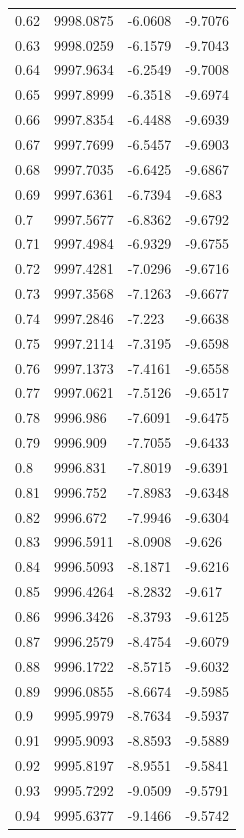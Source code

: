 \begin{table}[H]
\begin{tabular}{llll}
0.62 & 9998.0875 & -6.0608 & -9.7076 \\
0.63 & 9998.0259 & -6.1579 & -9.7043 \\
0.64 & 9997.9634 & -6.2549 & -9.7008 \\
0.65 & 9997.8999 & -6.3518 & -9.6974 \\
0.66 & 9997.8354 & -6.4488 & -9.6939 \\
0.67 & 9997.7699 & -6.5457 & -9.6903 \\
0.68 & 9997.7035 & -6.6425 & -9.6867 \\
0.69 & 9997.6361 & -6.7394 & -9.683 \\
0.7 & 9997.5677 & -6.8362 & -9.6792 \\
0.71 & 9997.4984 & -6.9329 & -9.6755 \\
0.72 & 9997.4281 & -7.0296 & -9.6716 \\
0.73 & 9997.3568 & -7.1263 & -9.6677 \\
0.74 & 9997.2846 & -7.223 & -9.6638 \\
0.75 & 9997.2114 & -7.3195 & -9.6598 \\
0.76 & 9997.1373 & -7.4161 & -9.6558 \\
0.77 & 9997.0621 & -7.5126 & -9.6517 \\
0.78 & 9996.986 & -7.6091 & -9.6475 \\
0.79 & 9996.909 & -7.7055 & -9.6433 \\
0.8 & 9996.831 & -7.8019 & -9.6391 \\
0.81 & 9996.752 & -7.8983 & -9.6348 \\
0.82 & 9996.672 & -7.9946 & -9.6304 \\
0.83 & 9996.5911 & -8.0908 & -9.626 \\
0.84 & 9996.5093 & -8.1871 & -9.6216 \\
0.85 & 9996.4264 & -8.2832 & -9.617 \\
0.86 & 9996.3426 & -8.3793 & -9.6125 \\
0.87 & 9996.2579 & -8.4754 & -9.6079 \\
0.88 & 9996.1722 & -8.5715 & -9.6032 \\
0.89 & 9996.0855 & -8.6674 & -9.5985 \\
0.9 & 9995.9979 & -8.7634 & -9.5937 \\
0.91 & 9995.9093 & -8.8593 & -9.5889 \\
0.92 & 9995.8197 & -8.9551 & -9.5841 \\
0.93 & 9995.7292 & -9.0509 & -9.5791 \\
0.94 & 9995.6377 & -9.1466 & -9.5742 \\

\end{tabular}
\end{table}
